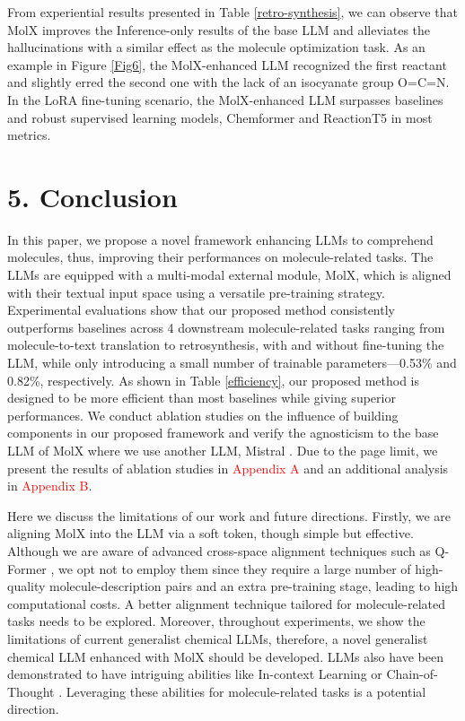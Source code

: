 \noindent
From experiential results presented in Table \ref{retro-synthesis}, we can observe that MolX improves the Inference-only results of the base LLM and alleviates the hallucinations with a similar effect as the molecule optimization task. As an example in Figure \ref{Fig6}, the MolX-enhanced LLM recognized the first reactant and slightly erred the second one with the lack of an isocyanate group O=C=N. In the LoRA fine-tuning scenario, the MolX-enhanced LLM surpasses baselines and robust supervised learning models, Chemformer \cite{irwin2022chemformer} and ReactionT5 \cite{sagawa2023reactiont5} in most metrics. 

\section{5. Conclusion}
In this paper, we propose a novel framework enhancing LLMs to comprehend molecules, thus, improving their performances on molecule-related tasks. The LLMs are equipped with a multi-modal external module, MolX, which is aligned with their textual input space using a versatile pre-training strategy. Experimental evaluations show that our proposed method consistently outperforms baselines across 4 downstream molecule-related tasks ranging from molecule-to-text translation to retrosynthesis, with and without fine-tuning the LLM, while only introducing a small number of trainable parameters—0.53\% and 0.82\%, respectively. As shown in Table \ref{efficiency}, our proposed method is designed to be more efficient than most baselines while giving superior performances. We conduct ablation studies on the influence of building components in our proposed framework and verify the agnosticism to the base LLM of MolX where we use another LLM, Mistral \cite{jiang2023mistral}. Due to the page limit, we present the results of ablation studies in \textcolor{red}{Appendix A} and an additional analysis in \textcolor{red}{Appendix B}. 

\noindent
Here we discuss the limitations of our work and future directions. Firstly, we are aligning MolX into the LLM via a soft token, though simple but effective. Although we are aware of advanced cross-space alignment techniques such as Q-Former \cite{li2023blip}, we opt not to employ them since they require a large number of high-quality molecule-description pairs and an extra pre-training stage, leading to high computational costs. A better alignment technique tailored for molecule-related tasks needs to be explored. Moreover, throughout experiments, we show the limitations of current generalist chemical LLMs, therefore, a novel generalist chemical LLM enhanced with MolX should be developed. LLMs also have been demonstrated to have intriguing abilities like In-context Learning \cite{brown2020language} or Chain-of-Thought \cite{wei2022chain}. Leveraging these abilities for molecule-related tasks is a potential direction.

